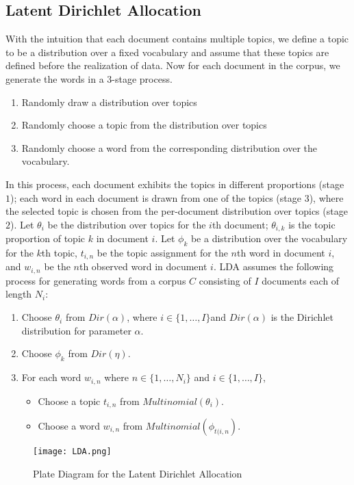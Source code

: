 \documentclass[9pt,notitlepage]{article}		%
\begin{document}
\subsection{Latent Dirichlet Allocation}
With the intuition that each document contains multiple topics, we define a topic to be a distribution over a fixed vocabulary and assume that these topics are defined before the realization of data. Now for each document in the corpus, we generate the words in a $3$-stage process. 
\begin{enumerate}
\item Randomly draw a distribution over topics
\item Randomly choose a topic from the distribution over topics 
\item Randomly choose a word from the corresponding distribution over the vocabulary. 
\end{enumerate}
In this process, each document exhibits the topics in different proportions (stage $1$); each word in each document is drawn from one of the topics (stage $3$), where the selected topic is chosen from the per-document distribution over topics (stage $2$). 
Let $\theta_{i}$ be the distribution over topics for the $i$th document; $\theta_{i,k}$ is the topic proportion of topic $k$ in document $i$. Let $\phi_{k}$ be a distribution over the vocabulary for the $k$th topic, $t_{i,n}$ be the topic assignment for the $n$th word in document $i$, and $w_{i,n}$ be the $n$th observed word in document $i$. LDA assumes the following process for generating words from a corpus $C$ consisting of $I$ documents each of length $N_i$: 

\begin{enumerate}

\item Choose $\theta_{i}$ from $Dir(\alpha)$, where $i \in \{1,\dots,I\}$and $Dir(\alpha)$ is the Dirichlet distribution for parameter $\alpha$. 
\item Choose $\phi_{k}$  from $Dir(\eta)$.
\item For each word $w_{i,n}$ where $n \in \{1,\dots,N_i\}$ and $i \in \{1,\dots,I\}$,
\begin{itemize}
\item Choose a topic $t_{i,n}$ from $Multinomial(\theta_{i})$.
\item Choose  a word $w_{i,n}$ from $Multinomial(\phi_{t(i,n})$.
\end{itemize}
\end{enumerate}
\begin{figure}[ht!]
\centering
\texttt{[image: LDA.png]}
\caption{Plate Diagram for the Latent Dirichlet Allocation}
\end{figure}
\FloatBarrier
\end{document}
